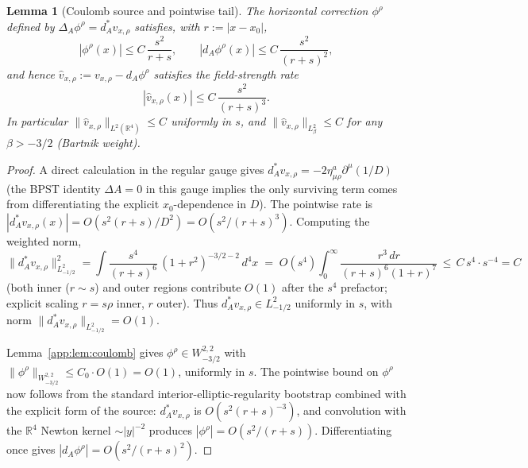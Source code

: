 \documentclass[11pt,letterpaper]{article}
\newtheorem{lemma}[theorem]{Lemma}
\theoremstyle{definition}
\newcommand{\bbR}{\mathbb{R}}
\newcommand{\Lap}{\Delta}
\begin{document}
\begin{lemma}[Coulomb source and pointwise tail]\label{app:lem:tail}
The horizontal correction $\phi^\rho$ defined by $\Lap_A\phi^\rho = d_A^* v_{x,\rho}$ satisfies, with $r := |x-x_0|$,
\[
|\phi^\rho(x)| \le C\,\frac{s^2}{r+s},\qquad |d_A\phi^\rho(x)| \le C\,\frac{s^2}{(r+s)^2},
\]
and hence $\hat v_{x,\rho} := v_{x,\rho} - d_A\phi^\rho$ satisfies the field-strength rate
\[
|\hat v_{x,\rho}(x)| \le C\,\frac{s^2}{(r+s)^3}.
\]
In particular $\|\hat v_{x,\rho}\|_{L^2(\bbR^4)} \le C$ uniformly in $s$, and $\|\hat v_{x,\rho}\|_{L^2_\beta} \le C$ for any $\beta > -3/2$ (Bartnik weight).
\end{lemma}

\begin{proof}
A direct calculation in the regular gauge gives $d_A^* v_{x,\rho} = -2\eta^a_{\mu\rho}\partial^\mu(1/D)$ (the BPST identity $\Lap A = 0$ in this gauge implies the only surviving term comes from differentiating the explicit $x_0$-dependence in $D$). The pointwise rate is $|d_A^* v_{x,\rho}(x)| = O(s^2(r+s)/D^2) = O(s^2/(r+s)^3)$. Computing the weighted norm,
\[
\|d_A^* v_{x,\rho}\|_{L^2_{-1/2}}^2 = \int \frac{s^4}{(r+s)^6}\,(1+r^2)^{-3/2-2}\,d^4x \;=\; O(s^4)\!\int_0^\infty \frac{r^3\,dr}{(r+s)^6 (1+r)^{7}} \,\le\, C\,s^4\cdot s^{-4} = C
\]
(both inner ($r\sim s$) and outer regions contribute $O(1)$ after the $s^4$ prefactor; explicit scaling $r = s\rho$ inner, $r$ outer). Thus $d_A^*v_{x,\rho}\in L^2_{-1/2}$ uniformly in $s$, with norm $\|d_A^*v_{x,\rho}\|_{L^2_{-1/2}} = O(1)$.

Lemma~\ref{app:lem:coulomb} gives $\phi^\rho \in W^{2,2}_{-3/2}$ with $\|\phi^\rho\|_{W^{2,2}_{-3/2}}\le C_0\cdot O(1) = O(1)$, uniformly in $s$. The pointwise bound on $\phi^\rho$ now follows from the standard interior-elliptic-regularity bootstrap combined with the explicit form of the source: $d_A^*v_{x,\rho}$ is $O(s^2(r+s)^{-3})$, and convolution with the $\bbR^4$ Newton kernel $\sim |y|^{-2}$ produces $|\phi^\rho| = O(s^2/(r+s))$. Differentiating once gives $|d_A\phi^\rho| = O(s^2/(r+s)^2)$.


\end{proof}
\end{document}

